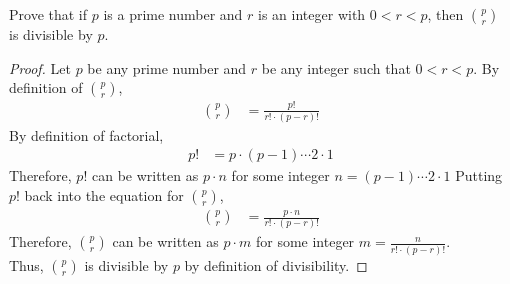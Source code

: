 \documentclass[name=Ojas\ Chaturvedi, emailid=oj.chaturvedi.2024, course=Capstone:\ Discrete\ Math, num=8, deadline={November\ 2,\ 2023}]{homework}
\begin{document}
Prove that if $p$ is a prime number and $r$ is an integer with $0<r<p$, then $p \choose r$ is divisible by $p$.
\begin{proof}
    Let $p$ be any prime number and $r$ be any integer such that $0 < r < p$.
    By definition of $p \choose r$,
    \begin{align*}
        p \choose r &= \frac{p!}{r! \cdot (p-r)!}
    \end{align*}
    By definition of factorial,
    \begin{align*}
        p! &= p \cdot (p-1) \cdots 2 \cdot 1
    \end{align*}
    Therefore, $p!$ can be written as $p \cdot n$ for some integer $n = (p-1) \cdots 2 \cdot 1$
    Putting $p!$ back into the equation for $p \choose r$,
    \begin{align*}
        p \choose r &= \frac{p \cdot n}{r! \cdot (p-r)!}
    \end{align*}
    Therefore, $p \choose r$ can be written as $p \cdot m$ for some integer $m = \frac{n}{r! \cdot (p-r)!}$. \\
    Thus, $p \choose r$ is divisible by $p$ by definition of divisibility.
\end{proof}

\separator
\end{document}
